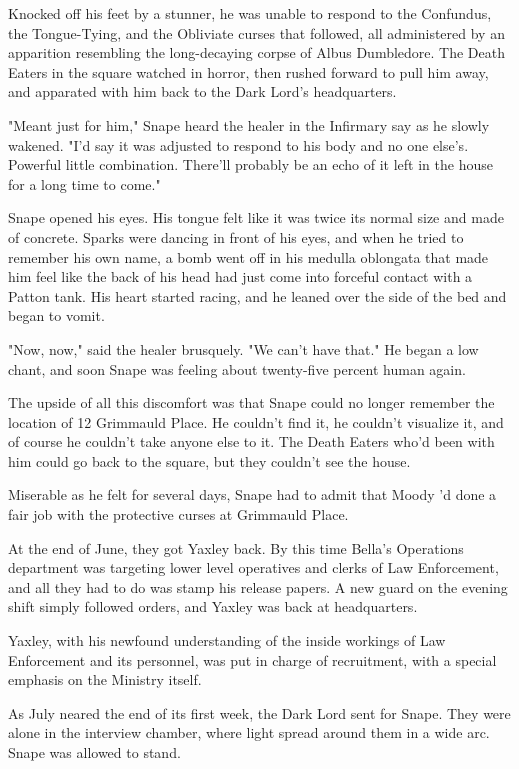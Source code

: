 Knocked off his feet by a stunner, he was unable to respond to the Confundus, the Tongue-Tying, and the Obliviate curses that followed, all administered by an apparition resembling the long-decaying corpse of Albus Dumbledore. The Death Eaters in the square watched in horror, then rushed forward to pull him away, and apparated with him back to the Dark Lord's headquarters.

"Meant just for him," Snape heard the healer in the Infirmary say as he slowly wakened. "I'd say it was adjusted to respond to his body and no one else's. Powerful little combination. There'll probably be an echo of it left in the house for a long time to come."

Snape opened his eyes. His tongue felt like it was twice its normal size and made of concrete. Sparks were dancing in front of his eyes, and when he tried to remember his own name, a bomb went off in his medulla oblongata that made him feel like the back of his head had just come into forceful contact with a Patton tank. His heart started racing, and he leaned over the side of the bed and began to vomit.

"Now, now," said the healer brusquely. "We can't have that." He began a low chant, and soon Snape was feeling about twenty-five percent human again.

The upside of all this discomfort was that Snape could no longer remember the location of 12 Grimmauld Place. He couldn't find it, he couldn't visualize it, and of course he couldn't take anyone else to it. The Death Eaters who'd been with him could go back to the square, but they couldn't see the house.

Miserable as he felt for several days, Snape had to admit that Moody 'd done a fair job with the protective curses at Grimmauld Place.

At the end of June, they got Yaxley back. By this time Bella's Operations department was targeting lower level operatives and clerks of Law Enforcement, and all they had to do was stamp his release papers. A new guard on the evening shift simply followed orders, and Yaxley was back at headquarters.

Yaxley, with his newfound understanding of the inside workings of Law Enforcement and its personnel, was put in charge of recruitment, with a special emphasis on the Ministry itself.

As July neared the end of its first week, the Dark Lord sent for Snape. They were alone in the interview chamber, where light spread around them in a wide arc. Snape was allowed to stand.

